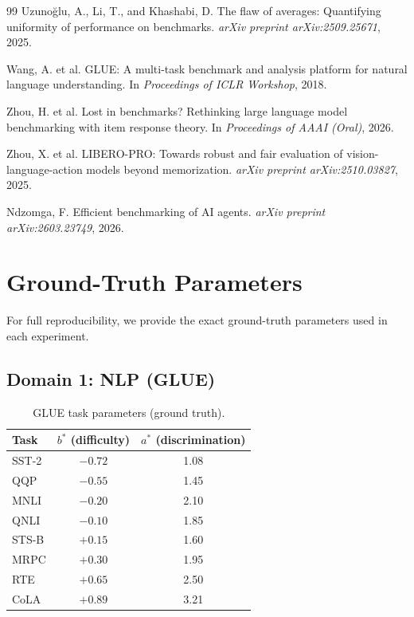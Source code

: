 \documentclass[11pt,a4paper]{article}
\begin{document}
\begin{thebibliography}{99}
 Uzuno\u{g}lu, A., Li, T., and Khashabi, D. The flaw of averages: Quantifying uniformity of performance on benchmarks. \emph{arXiv preprint arXiv:2509.25671}, 2025.

 Wang, A. et al. GLUE: A multi-task benchmark and analysis platform for natural language understanding. In \emph{Proceedings of ICLR Workshop}, 2018.

 Zhou, H. et al. Lost in benchmarks? Rethinking large language model benchmarking with item response theory. In \emph{Proceedings of AAAI (Oral)}, 2026.

 Zhou, X. et al. LIBERO-PRO: Towards robust and fair evaluation of vision-language-action models beyond memorization. \emph{arXiv preprint arXiv:2510.03827}, 2025.

 Ndzomga, F. Efficient benchmarking of AI agents. \emph{arXiv preprint arXiv:2603.23749}, 2026.

\end{thebibliography}

\appendix

\section{Ground-Truth Parameters}

For full reproducibility, we provide the exact ground-truth parameters used in each experiment.

\subsection{Domain 1: NLP (GLUE)}

\begin{table}[h]
\centering
\caption{GLUE task parameters (ground truth).}
\small
\begin{tabular}{lcc}
\toprule
Task & $b^*$ (difficulty) & $a^*$ (discrimination) \\
\midrule
SST-2 & $-0.72$ & 1.08 \\
QQP & $-0.55$ & 1.45 \\
MNLI & $-0.20$ & 2.10 \\
QNLI & $-0.10$ & 1.85 \\
STS-B & $+0.15$ & 1.60 \\
MRPC & $+0.30$ & 1.95 \\
RTE & $+0.65$ & 2.50 \\
CoLA & $+0.89$ & 3.21 \\
\bottomrule
\end{tabular}
\end{table}
\end{document}

